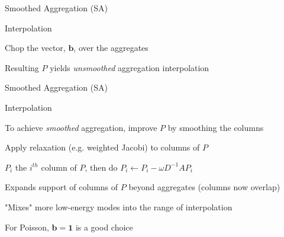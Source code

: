 \documentclass[18pt,xcolor=table]{beamer}
\begin{document}
\begin{frame}{Smoothed Aggregation (SA)}
\begin{block}{Interpolation}
\bit
\item Chop the vector, $\mathbf{b}$, over the aggregates
\item Resulting $P$ yields \emph{unsmoothed} aggregation interpolation
\eit
\end{block}
\end{frame}

\begin{frame}{Smoothed Aggregation (SA)}
\begin{block}{Interpolation}
\bit
\item To achieve \emph{smoothed} aggregation, improve $P$ by smoothing the columns
\item Apply relaxation (e.g. weighted Jacobi) to columns of $P$
\item $P_i$ the $i^{th}$ column of $P$, then do $P_i \leftarrow P_i - \omega D^{-1}AP_i$
\item Expands support of columns of $P$ beyond aggregates (columns now overlap)
\item "Mixes" more low-energy modes into the range of interpolation
\item For Poisson, $\mathbf{b} = \mathbf{1}$ is a good choice
\eit
\end{block}
\end{frame}
\end{document}
